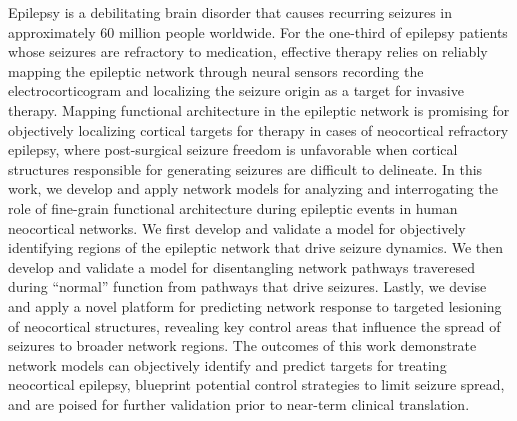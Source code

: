 
\begin{abstracts}
Epilepsy is a debilitating brain disorder that causes recurring seizures in approximately 60 million people worldwide. For the one-third of epilepsy patients whose seizures are refractory to medication, effective therapy relies on reliably mapping the epileptic network through neural sensors recording the electrocorticogram and localizing the seizure origin as a target for invasive therapy. Mapping functional architecture in the epileptic network is promising for objectively localizing cortical targets for therapy in cases of neocortical refractory epilepsy, where post-surgical seizure freedom is unfavorable when cortical structures responsible for generating seizures are difficult to delineate. In this work, we develop and apply network models for analyzing and interrogating the role of fine-grain functional architecture during epileptic events in human neocortical networks. We first develop and validate a model for objectively identifying regions of the epileptic network that drive seizure dynamics. We then develop and validate a model for disentangling network pathways traveresed during ``normal'' function from pathways that drive seizures. Lastly, we devise and apply a novel platform for predicting network response to targeted lesioning of neocortical structures, revealing key control areas that influence the spread of seizures to broader network regions. The outcomes of this work demonstrate network models can objectively identify and predict targets for treating neocortical epilepsy, blueprint potential control strategies to limit seizure spread, and are poised for further validation prior to near-term clinical translation.
\end{abstracts}

